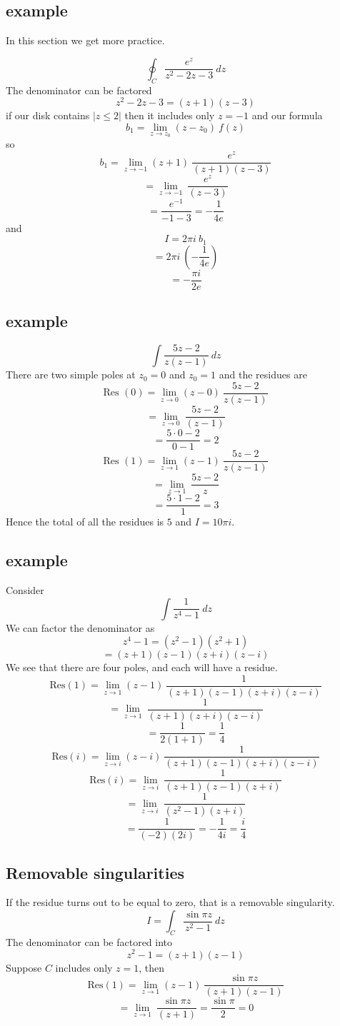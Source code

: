 \documentclass[11pt, oneside]{article}   	%
\begin{document}
\subsection*{example}
In this section we get more practice.

\[ \oint_C \frac{e^z}{z^2 - 2z - 3} \ dz \]
The denominator can be factored
\[ z^2 - 2z - 3 = (z + 1)(z - 3) \]
if our disk contains $|z \le 2|$ then it includes only $z = -1$ and our formula
\[ b_1 = \lim_{z \rightarrow z_0} (z-z_0) \ f(z)  \]
so
\[ b_1 = \lim_{z \rightarrow -1} (z+1) \ \frac{e^z}{(z + 1)(z - 3)}  \]
\[ = \lim_{z \rightarrow -1} \ \frac{e^z}{(z - 3)}  \]
\[ = \frac{e^{-1}}{-1 - 3} = - \frac{1}{4 e} \]
and
\[ I = 2 \pi i \ b_1 \]
\[ = 2 \pi i \ (- \frac{1}{4 e}) \]
\[ = - \frac{\pi i}{2 e} \]

\subsection*{example}
\[ \int \frac{5z-2}{z(z-1)} \ dz \]
There are two simple poles at $z_0 = 0$ and $z_0 = 1$ and the residues are
\[ \text{Res }(0) = \lim_{z \rightarrow 0} (z - 0) \ \frac{5z-2}{z(z-1)} \]
\[ = \lim_{z \rightarrow 0} \ \frac{5z-2}{(z-1)} \]
\[ = \frac{5 \cdot 0 - 2}{0 - 1} = 2 \]
\[ \text{Res }(1) = \lim_{z \rightarrow 1} (z - 1) \ \frac{5z-2}{z(z-1)} \]
\[ = \lim_{z \rightarrow 1} \ \frac{5z-2}{z} \]
\[ = \frac{5 \cdot 1 - 2}{1} = 3 \]
Hence the total of all the residues is $5$ and $I = 10 \pi i$.

\subsection*{example}
Consider
\[ \int \frac{1}{z^4 - 1} \ dz \]
We can factor the denominator as
\[ z^4 - 1 = (z^2 - 1)(z^2 + 1) \]
\[ = (z+1)(z-1)(z+i)(z-i) \]
We see that there are four poles, and each will have a residue.
\[ \text{Res}(1) =  \lim_{z \rightarrow 1} (z-1) \ \frac{1}{(z+1)(z-1)(z+i)(z-i)} \]
\[ =  \lim_{z \rightarrow 1} \ \frac{1}{(z+1)(z+i)(z-i)} \]
\[ = \frac{1}{2(1+1)} = \frac{1}{4} \]
\[ \text{Res}(i) =  \lim_{z \rightarrow i} (z-i) \ \frac{1}{(z+1)(z-1)(z+i)(z-i)} \]
\[ \text{Res}(i) =  \lim_{z \rightarrow i} \ \frac{1}{(z+1)(z-1)(z+i)} \]
\[ =  \lim_{z \rightarrow i} \ \frac{1}{(z^2 - 1)(z+i)} \]
\[ = \frac{1}{(-2)(2i)} = -\frac{1}{4i} = \frac{i}{4}  \]

\subsection*{Removable singularities}
If the residue turns out to be equal to zero, that is a removable singularity.  
\[ I = \int_C \frac{\sin \pi z}{z^2 - 1} \ dz \]
The denominator can be factored into 
\[ z^2 - 1 = (z + 1)(z - 1) \]
Suppose $C$ includes only $z = 1$, then
\[ \text{Res}(1) = \lim_{z \rightarrow 1}  (z-1) \ \frac{\sin \pi z}{(z + 1)(z - 1)} \]
\[ = \lim_{z \rightarrow 1} \ \frac{\sin \pi z}{(z + 1)} = \frac{\sin \pi}{2} =  0 \]
\end{document}
